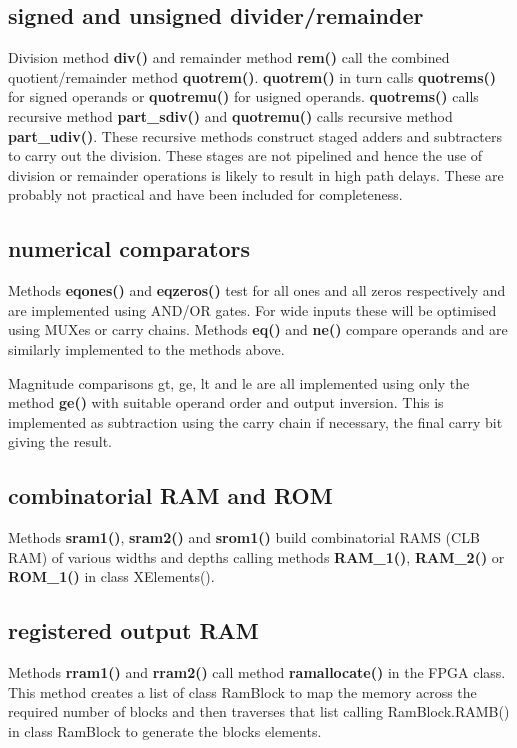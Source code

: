 \subsection{signed and unsigned divider/remainder}

    Division method {\bf div()} and remainder method {\bf rem()} call the combined
    quotient/remainder method {\bf quotrem()}. {\bf quotrem()} in turn calls {\bf
    quotrems()} for signed operands or {\bf quotremu()} for usigned operands. {\bf
    quotrems()} calls recursive method {\bf part\_sdiv()} and {\bf quotremu()}
    calls recursive method {\bf part\_udiv()}. These recursive methods construct
    staged adders and subtracters to carry out the division. These stages are not
    pipelined and hence the use of division or remainder operations is likely to
    result in high path delays. These are probably not practical and have been
    included for completeness.

    
\subsection{numerical comparators}

    Methods {\bf eqones()} and {\bf eqzeros()} test for all ones and all zeros
    respectively and are implemented using AND/OR gates. For wide inputs these
    will be optimised using MUXes or carry chains.     Methods {\bf eq()} and {\bf
    ne()} compare operands and are similarly implemented to the methods above.

    Magnitude comparisons gt, ge, lt and le are all implemented using only the
    method {\bf ge()} with suitable operand order and output inversion. This is
    implemented as subtraction using the carry chain if necessary, the final carry
    bit giving the result.



\subsection{combinatorial RAM and ROM}

    Methods {\bf sram1()}, {\bf sram2()} and {\bf srom1()} build combinatorial
    RAMS (CLB RAM) of various widths and depths calling methods {\bf RAM\_1()},
    {\bf RAM\_2()} or {\bf ROM\_1()} in class XElements().


\subsection{registered output RAM}

    Methods {\bf rram1()} and {\bf rram2()} call method {\bf ramallocate()}
    in the FPGA class. This method creates a list of class RamBlock to map
    the memory across the required number of blocks and then traverses that list
    calling RamBlock.RAMB() in class RamBlock to generate the blocks elements.
